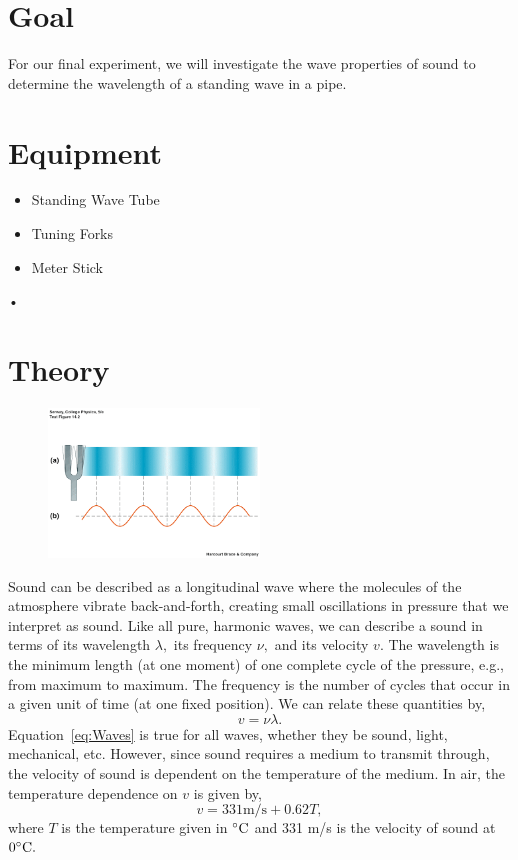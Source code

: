 \documentclass[main.tex]{subfiles}
\begin{document}
\section*{Goal}
For our final experiment, we will investigate the wave properties of sound to determine the wavelength of a standing wave in a pipe.

\section*{Equipment}
\begin{itemize}
\item
Standing Wave Tube
\item
Tuning Forks
\item
Meter Stick
\end{itemize}•

\section*{Theory}
\begin{figure}
\centering
\includegraphics[width=0.5\textwidth]{Sound_longitudinal}
\caption{} \label{fig:Longitudinal}
\end{figure}
Sound can be described as a longitudinal wave where the molecules of the atmosphere vibrate back-and-forth, creating small oscillations in pressure that we interpret as sound. Like all pure, harmonic waves, we can describe a sound in terms of its wavelength $\lambda,$ its frequency $\nu,$ and its velocity $v.$ The wavelength is the minimum length (at one moment) of one complete cycle of the pressure, e.g., from maximum to maximum. The frequency is the number of cycles that occur in a given unit of time (at one fixed position). We can relate these quantities by,
\begin{equation} \label{eq:Waves}
v=\nu\lambda.
\end{equation}
Equation~\eqref{eq:Waves} is true for all waves, whether they be sound, light, mechanical, etc. However, since sound requires a medium to transmit through, the velocity of sound is dependent on the temperature of the medium. In air, the temperature dependence on $v$ is given by,
\begin{equation} \label{eq:Vsound}
v=331 \text{m}/\text{s} + 0.62 T,
\end{equation}
where $T$ is the temperature given in $\celsius$ and 331 m/s is the velocity of sound at $0\celsius.$
\end{document}
